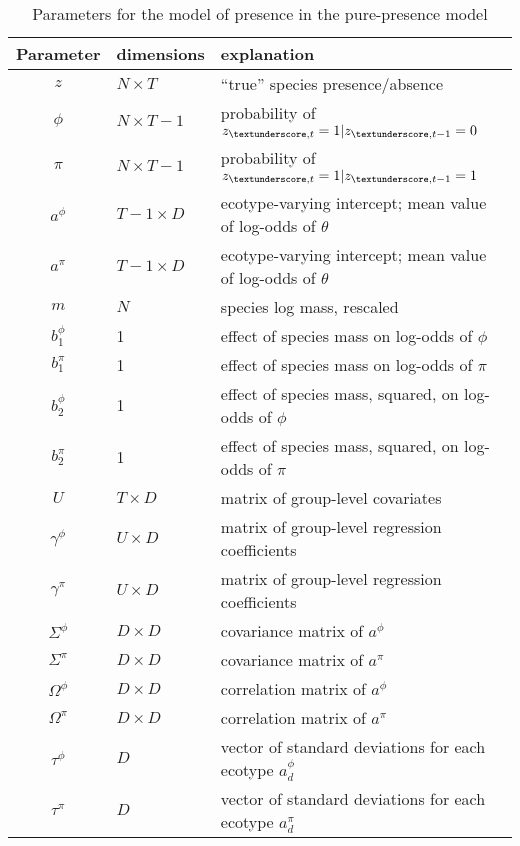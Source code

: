 \documentclass[12pt,letterpaper]{article}
\begin{document}
\begin{table}
  \centering
  \caption{Parameters for the model of presence in the pure-presence model}
  \begin{tabular}{c l l}
    Parameter & dimensions & explanation \\
    \hline
    \(z\) & \(N \times T\) & ``true'' species presence/absence \\
    \(\phi\) & \(N \times T - 1\) & probability of \(z_{\textunderscore, t} = 1 | z_{\textunderscore, t - 1} = 0 \) \\
    \(\pi\) & \(N \times T - 1\) & probability of \(z_{\textunderscore, t} = 1 | z_{\textunderscore, t - 1} = 1 \) \\
    \(a^{\phi}\) & \(T - 1 \times D\) & ecotype-varying intercept; mean value of log-odds of \(\theta\) \\
    \(a^{\pi}\) & \(T - 1 \times D\) & ecotype-varying intercept; mean value of log-odds of \(\theta\) \\
    \(m\) & \(N\) & species log mass, rescaled \\
    \(b^{\phi}_{1}\) & 1 & effect of species mass on log-odds of \(\phi\) \\
    \(b^{\pi}_{1}\) & 1 & effect of species mass on log-odds of \(\pi\) \\
    \(b^{\phi}_{2}\) & 1 & effect of species mass, squared, on log-odds of \(\phi\) \\
    \(b^{\pi}_{2}\) & 1 & effect of species mass, squared, on log-odds of \(\pi\) \\
    \(U\) & \(T \times D\) & matrix of group-level covariates \\
    \(\gamma^{\phi}\) & \(U \times D\) & matrix of group-level regression coefficients \\
    \(\gamma^{\pi}\) & \(U \times D\) & matrix of group-level regression coefficients \\
    \(\Sigma^{\phi}\) & \(D \times D\) & covariance matrix of \(a^{\phi}\) \\
    \(\Sigma^{\pi}\) & \(D \times D\) & covariance matrix of \(a^{\pi}\) \\
    \(\Omega^{\phi}\) & \(D \times D\) & correlation matrix of \(a^{\phi}\) \\
    \(\Omega^{\pi}\) & \(D \times D\) & correlation matrix of \(a^{\pi}\) \\
    \(\tau^{\phi}\) & \(D\) & vector of standard deviations for each ecotype \(a^{\phi}_{d}\) \\
    \(\tau^{\pi}\) & \(D\) & vector of standard deviations for each ecotype \(a^{\pi}_{d}\) \\
  \end{tabular}
  \label{tab:bd_param}
\end{table}
\end{document}
